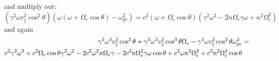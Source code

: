 \documentclass[]{article}
\begin{document}
and multiply out:
\begin{equation}
(\gamma^2 \omega v_\parallel^2 \cos^2\theta) (\omega(\omega + \Omega_e \cos\theta) - \omega_{pe}^2) = c^2 (\omega + \Omega_e \cos\theta)(\gamma^2 \omega^2 -2 n \Omega_e \gamma \omega + n^2 \Omega_e^2) \end{equation}
and again
\begin{align}
\gamma^2\omega^3 v_\parallel^2 \cos^2 \theta + \gamma^2 \omega^2 v_\parallel^2 \cos^3\theta\Omega_e - \gamma^2\omega v_\parallel^2\cos^2\theta\omega_{pe}^2 &=\notag\\ c^2\gamma^2 \omega^3 + c^2 \Omega_e\cos\theta \gamma^2\omega^2 - 2 c^2 \omega^2 n\Omega_e\gamma - 2 c^2 n \Omega_e^2 \gamma\omega\cos\theta + c^2 \omega n^2\Omega_e^2 + c^2 n^2\Omega_e^3\cos\theta &
\end{align}
\end{document}
